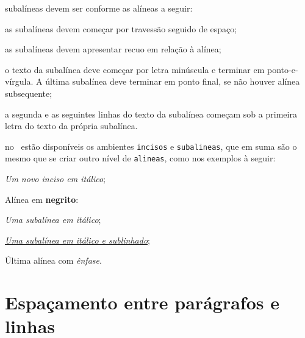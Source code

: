 \begin{alineas}
  \item subalíneas \cite[4.3]{NBR6024:2012} devem ser conforme as alíneas a
  seguir:

  \begin{alineas}
     \item as subalíneas devem começar por travessão seguido de espaço;

     \item as subalíneas devem apresentar recuo em relação à alínea;

     \item o texto da subalínea deve começar por letra minúscula e terminar em
     ponto-e-vírgula. A última subalínea deve terminar em ponto final, se não
     houver alínea subsequente;

     \item a segunda e as seguintes linhas do texto da subalínea começam sob a
     primeira letra do texto da própria subalínea.
  \end{alineas}

  \item no \abnTeX\ estão disponíveis os ambientes \texttt{incisos} e \texttt{subalineas}, que em suma são o mesmo que se criar outro nível de \texttt{alineas}, como nos exemplos à seguir:

  \begin{incisos}
    \item \textit{Um novo inciso em itálico};
  \end{incisos}

  \item Alínea em \textbf{negrito}:

  \begin{subalineas}
    \item \textit{Uma subalínea em itálico};
    \item \underline{\textit{Uma subalínea em itálico e sublinhado}};
  \end{subalineas}

  \item Última alínea com \emph{ênfase}.

\end{alineas}


\section{Espaçamento entre parágrafos e linhas}

